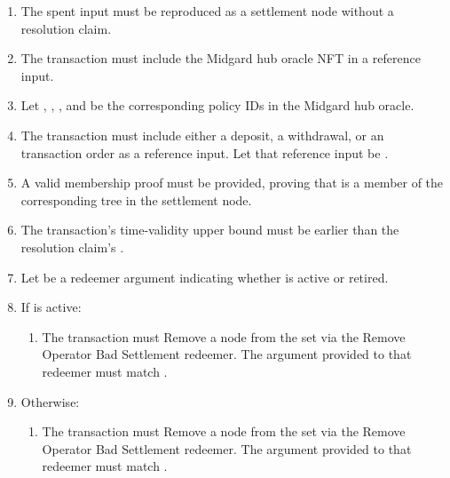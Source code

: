 \documentclass[../midgard.tex]{subfiles}
\begin{document}
\begin{description}
\begin{enumerate}
        \item The spent input must be reproduced as a settlement node without a resolution claim.
        \item The transaction must include the Midgard hub oracle NFT in a reference input.
        \item Let , , , and  be the corresponding policy IDs in the Midgard hub oracle.
        \item The transaction must include either a deposit, a withdrawal, or an transaction order as a reference input.
          Let that reference input be .
        \item A valid membership proof must be provided, proving that  is a member of the corresponding tree in the settlement node.
        \item The transaction's time-validity upper bound must be earlier than the resolution claim's .
        \item Let  be a redeemer argument indicating whether  is active or retired.
        \item If  is active:
            \begin{enumerate}
                \item The transaction must Remove a node from the  set via the Remove Operator Bad Settlement redeemer.
                  The  argument provided to that redeemer must match .
            \end{enumerate}
        \item Otherwise:
            \begin{enumerate}
                \item The transaction must Remove a node from the  set via the Remove Operator Bad Settlement redeemer.
                  The  argument provided to that redeemer must match .
            \end{enumerate}
      \end{enumerate}
\end{description}
\end{document}
